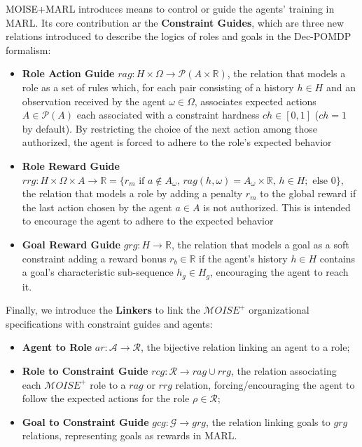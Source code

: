 \documentclass[pdflatex,sn-mathphys-num]{sn-jnl}%
\theoremstyle{thmstyleone}%
\theoremstyle{thmstyletwo}%
\theoremstyle{thmstylethree}%
\begin{document}
\noindent MOISE+MARL introduces means to control or guide the agents' training in MARL. Its core contribution ar the \textbf{Constraint Guides}, which are three new relations introduced to describe the logics of roles and goals in the Dec-POMDP formalism:
%
\begin{itemize}
    
    \item \textbf{Role Action Guide} \quad $rag: H \times \Omega \rightarrow \mathcal{P}(A \times \mathbb{R})$, the relation that models a role as a set of rules which, for each pair consisting of a history $h \in H$ and an observation received by the agent $\omega \in \Omega$, associates expected actions $A \in \mathcal{P}(A)$ each associated with a constraint hardness $ch \in [0,1]$ ($ch = 1$ by default). By restricting the choice of the next action among those authorized, the agent is forced to adhere to the role's expected behavior
    \item \textbf{Role Reward Guide} \quad $rrg: H \times \Omega \times A \to \mathbb{R} = \{r_m \text{ if } a \notin A_\omega \text{, } rag(h, \omega) \allowbreak = \allowbreak A_\omega \times \mathbb{R} \text{, } h \in H; \text{ else } 0\}$, the relation that models a role by adding a penalty $r_m$ to the global reward if the last action chosen by the agent $a \in A$ is not authorized. This is intended to encourage the agent to adhere to the expected behavior
    \item \textbf{Goal Reward Guide} \quad $grg: H \rightarrow \mathbb{R}$, the relation that models a goal as a soft constraint adding a reward bonus $r_b \in \mathbb{R}$ if the agent's history $h \in H$ contains a goal's characteristic sub-sequence $h_g \in H_g$, encouraging the agent to reach it.
\end{itemize}

\noindent Finally, we introduce the \textbf{Linkers} to link the $\mathcal{M}OISE^+$ organizational specifications with constraint guides and agents:
%
\begin{itemize}
    
    \item \textbf{Agent to Role} \quad $ar: \mathcal{A} \to \mathcal{R}$, the bijective relation linking an agent to a role;
    \item \textbf{Role to Constraint Guide} \quad $rcg: \mathcal{R} \rightarrow rag \cup rrg$, the relation associating each $\mathcal{M}OISE^+$ role to a $rag$ or $rrg$ relation, forcing/encouraging the agent to follow the expected actions for the role $\rho \in \mathcal{R}$;
    \item \textbf{Goal to Constraint Guide} \quad $gcg: \mathcal{G} \rightarrow grg$, the relation linking goals to $grg$ relations, representing goals as rewards in MARL.
\end{itemize}
\end{document}
